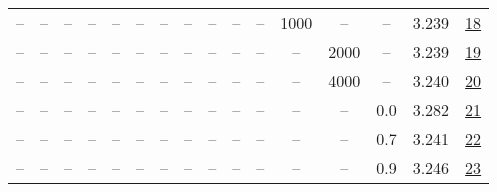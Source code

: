 \begin{table}[H]
\begin{tabular}{cccccccccccccccc}
-- & -- & -- & -- & -- & -- & -- & -- & -- & -- & -- & 1000 & -- & -- & 3.239 & \href{https://wandb.ai/stanford-mercury/optimizer-scaling/runs/sweep-130m-21B-kronaca326lr0.001-wd0.5-b10.95-plr0.2-pis1-gn1-no-ac5a71}{18} \\
-- & -- & -- & -- & -- & -- & -- & -- & -- & -- & -- & -- & 2000 & -- & 3.239 & \href{https://wandb.ai/stanford-mercury/optimizer-scaling/runs/sweep-130m-21B-kron10a92elr0.001-wd0.5-b10.95-plr0.2-pis1-gn1-no-3032fa}{19} \\
-- & -- & -- & -- & -- & -- & -- & -- & -- & -- & -- & -- & 4000 & -- & 3.240 & \href{https://wandb.ai/stanford-mercury/optimizer-scaling/runs/sweep-130m-21B-kron05e14blr0.001-wd0.5-b10.95-plr0.2-pis1-gn1-no-e82a82}{20} \\
-- & -- & -- & -- & -- & -- & -- & -- & -- & -- & -- & -- & -- & 0.0 & 3.282 & \href{https://wandb.ai/stanford-mercury/optimizer-scaling/runs/sweep-130m-21B-kron5f7b04lr0.001-wd0.0-b10.95-plr0.2-pis1-gn1-no-f3b5d3}{21} \\
-- & -- & -- & -- & -- & -- & -- & -- & -- & -- & -- & -- & -- & 0.7 & 3.241 & \href{https://wandb.ai/stanford-mercury/optimizer-scaling/runs/sweep-130m-21B-kronc9ae15lr0.001-wd0.7-b10.95-plr0.2-pis1-gn1-no-db4b18}{22} \\
-- & -- & -- & -- & -- & -- & -- & -- & -- & -- & -- & -- & -- & 0.9 & 3.246 & \href{https://wandb.ai/stanford-mercury/optimizer-scaling/runs/sweep-130m-21B-kron4898eflr0.001-wd0.9-b10.95-plr0.2-pis1-gn1-no-313f60}{23} \\
\bottomrule
\end{tabular}
\end{table}

